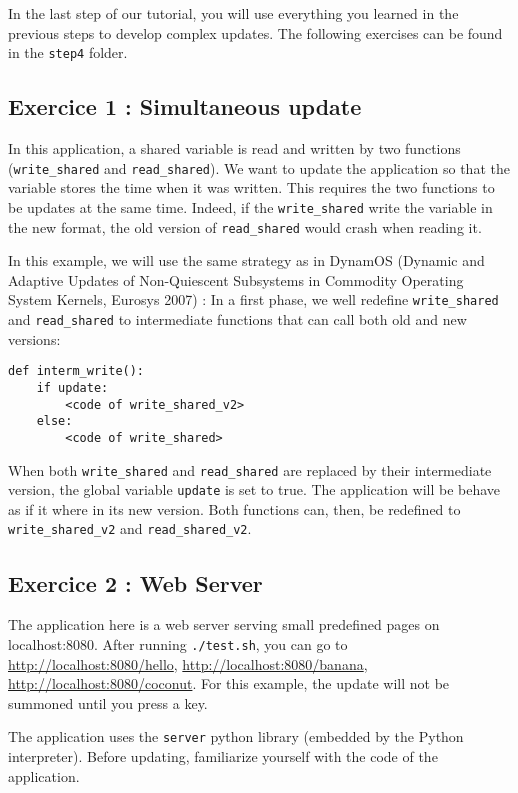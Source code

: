\documentclass{article}
\begin{document}
In the last step of our tutorial, you will use everything you learned
in the previous steps to develop complex updates. The
following exercises can be found in the \texttt{step4} folder.

\subsection{Exercice 1 : Simultaneous update}

In this application, a shared variable is read and written by two
functions (\texttt{write\_shared} and \texttt{read\_shared}). We want
to update the application so that the variable stores the time when it
was written. This requires the two functions to be updates at the same
time. Indeed, if the \texttt{write\_shared} write the variable in the
new format, the old version of \texttt{read\_shared} would crash when
reading it.

In this example, we will use the same strategy as in DynamOS (Dynamic
and Adaptive Updates of Non-Quiescent Subsystems in Commodity
Operating System Kernels, Eurosys 2007) : In a first phase, we well
redefine \texttt{write\_shared} and \texttt{read\_shared} to
intermediate functions that can call both old and new versions:

\begin{verbatim}
def interm_write():
    if update:
        <code of write_shared_v2>
    else:
        <code of write_shared>
\end{verbatim}
 
When both \texttt{write\_shared} and \texttt{read\_shared} are
replaced by their intermediate version, the global variable
\texttt{update} is set to true. The application will be behave as if
it where in its new version. Both functions can, then, be redefined to
\texttt{write\_shared\_v2} and \texttt{read\_shared\_v2}.


\subsection{Exercice 2 : Web Server}

The application here is a web server serving small predefined pages on
localhost:8080. After running \texttt{./test.sh}, you can go to
\url{http://localhost:8080/hello}, \url{http://localhost:8080/banana},
\url{http://localhost:8080/coconut}. For this example, the update will
not be summoned until you press a key.

The application uses the \texttt{server} python library (embedded by
the Python interpreter). Before updating, familiarize yourself with
the code of the application.
\end{document}
